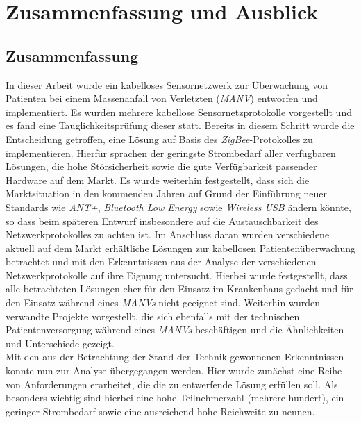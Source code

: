 
\chapter{Zusammenfassung und Ausblick}\label{Ausblick}

\section{Zusammenfassung}
In dieser Arbeit wurde ein kabelloses Sensornetzwerk zur Überwachung von Patienten bei einem 
Massenanfall von Verletzten (\emph{MANV}) entworfen und implementiert. Es wurden 
mehrere kabellose Sensornetzprotokolle vorgestellt und es fand eine Tauglichkeitsprüfung dieser statt.
Bereits in diesem Schritt wurde die Entscheidung
getroffen, eine Lösung auf Basis des \emph{ZigBee}-Protokolles zu implementieren. Hierfür sprachen
der geringste Strombedarf aller verfügbaren Lösungen, die hohe Störsicherheit sowie die
gute Verfügbarkeit passender Hardware auf dem Markt. Es wurde weiterhin festgestellt, dass sich die
Marktsituation in den kommenden Jahren auf Grund der Einführung neuer Standards wie \emph{ANT+},
\emph{Bluetooth Low Energy} sowie \emph{Wireless USB} ändern könnte, so dass beim späteren Entwurf
insbesondere auf die Austauschbarkeit des Netzwerkprotokolles zu achten ist. Im Anschluss daran wurden
verschiedene aktuell auf dem Markt erhältliche Lösungen zur kabellosen Patientenüberwachung betrachtet 
und mit den Erkenntnissen aus der Analyse der verschiedenen Netzwerkprotokolle auf ihre Eignung untersucht.
Hierbei wurde festgestellt, dass alle betrachteten Lösungen eher für den Einsatz im Krankenhaus
gedacht und für den Einsatz während eines \emph{MANVs} nicht geeignet sind. Weiterhin wurden verwandte
Projekte vorgestellt, die sich ebenfalls mit der technischen Patientenversorgung während eines \emph{MANVs} beschäftigen
und die Ähnlichkeiten und Unterschiede gezeigt.\\
Mit den aus der Betrachtung der Stand der Technik gewonnenen Erkenntnissen konnte nun zur Analyse 
übergegangen werden. Hier wurde zunächst eine Reihe von Anforderungen erarbeitet, die die zu entwerfende 
Lösung erfüllen soll. Als besonders wichtig sind hierbei eine hohe Teilnehmerzahl (mehrere hundert), 
ein geringer Strombedarf sowie eine ausreichend hohe Reichweite zu nennen. 
